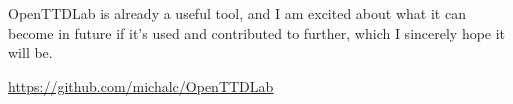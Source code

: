 \documentclass[logo,msc,dsti]{style/infthesis}    %
\begin{document}
{OpenTTDLab is already a useful tool, and I am excited about what it can become in future if it's used and contributed to further, which I sincerely hope it will be.

\vspace{1em}
\centerline{\url{https://github.com/michalc/OpenTTDLab}}













}
\end{document}

